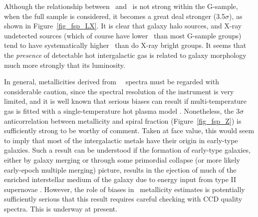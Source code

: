 \documentclass[usenatbib]{mn2e}
\begin{document}
Although the relationship between \fsp\ and \LX\ is not strong within the
G-sample, when the full sample is considered, it becomes a great deal stronger
(3.5$\sigma$), as shown in Figure~\ref{fig_fsp_LX}.  It is clear that galaxy
halo sources, and X-ray undetected sources (which of course have lower \LX\ than
most G-sample groups) tend to have systematically higher \fsp\ than do X-ray
bright groups.  It seems that the {\it presence} of detectable hot
intergalactic gas is related to galaxy morphology much more strongly that its
luminosity.

In general, metallicities derived from \ROSAT\ \PSPC\ spectra must be regarded
with considerable caution, since the spectral resolution of the instrument is
very limited, and it is well known that serious biases can result if
multi-temperature gas is fitted with a single-temperature hot plasma model
\citep{buote98}. Nonetheless, the 3$\sigma$ anticorrelation between metallicity
and spiral fraction (Figure~\ref{fig_fsp_Z}) is sufficiently strong to be
worthy of comment.  Taken at face value, this would seem to imply that most of
the intergalactic metals have their origin in early-type galaxies.  Such a result
can be understood if the formation of early-type galaxies, either by galaxy
merging or through some primordial collapse (or more likely early-epoch multiple
merging) picture, results in the ejection of much of the enriched interstellar
medium of the galaxy due to energy input from type II supernovae
\citep{matteucci87,kauffmann98}.  However, the role of biases in \ROSAT\
metallicity estimates is potentially sufficiently serious that this result
requires careful checking with CCD quality spectra.  This is underway at present.
\end{document}
